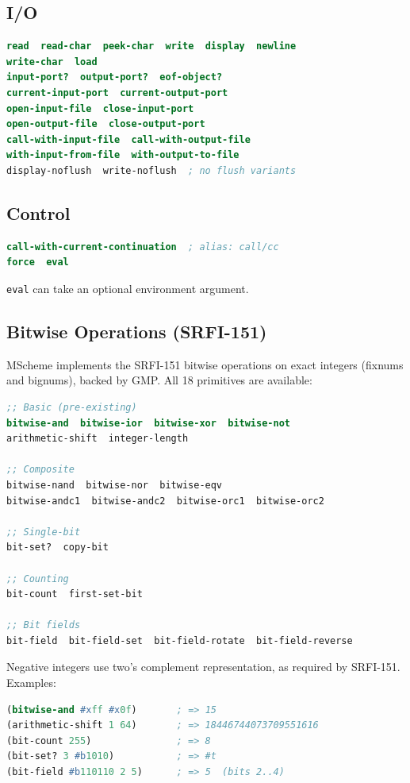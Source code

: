 \documentclass[12pt]{report}
\begin{document}
\subsection{I/O}

\begin{lstlisting}[language=Scheme]
read  read-char  peek-char  write  display  newline
write-char  load
input-port?  output-port?  eof-object?
current-input-port  current-output-port
open-input-file  close-input-port
open-output-file  close-output-port
call-with-input-file  call-with-output-file
with-input-from-file  with-output-to-file
display-noflush  write-noflush  ; no flush variants
\end{lstlisting}

\subsection{Control}

\begin{lstlisting}[language=Scheme]
call-with-current-continuation  ; alias: call/cc
force  eval
\end{lstlisting}

{\tt eval} can take an optional environment argument.

\subsection{Bitwise Operations (SRFI-151)}\label{sec:bitwise}

MScheme implements the SRFI-151 bitwise operations on exact integers
(fixnums and bignums), backed by GMP.  All 18 primitives are available:

\begin{lstlisting}[language=Scheme]
;; Basic (pre-existing)
bitwise-and  bitwise-ior  bitwise-xor  bitwise-not
arithmetic-shift  integer-length

;; Composite
bitwise-nand  bitwise-nor  bitwise-eqv
bitwise-andc1  bitwise-andc2  bitwise-orc1  bitwise-orc2

;; Single-bit
bit-set?  copy-bit

;; Counting
bit-count  first-set-bit

;; Bit fields
bit-field  bit-field-set  bit-field-rotate  bit-field-reverse
\end{lstlisting}

\noindent
Negative integers use two's complement representation, as required
by SRFI-151.  Examples:

\begin{lstlisting}[language=Scheme]
(bitwise-and #xff #x0f)       ; => 15
(arithmetic-shift 1 64)       ; => 18446744073709551616
(bit-count 255)               ; => 8
(bit-set? 3 #b1010)           ; => #t
(bit-field #b110110 2 5)      ; => 5  (bits 2..4)
\end{lstlisting}
\end{document}
